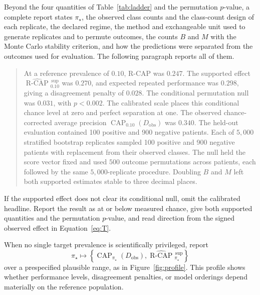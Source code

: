 \documentclass[11pt]{article}
\newcommand{\CAP}{\operatorname{CAP}}
\newcommand{\Tpi}{\CAP_{\pi_\star}}
\newcommand{\RCAPHat}{\widehat{\operatorname{R\text{-}CAP}}{}^{\,\mathrm{sup}}_{\pi_\star}}
\theoremstyle{remark}
\begin{document}
Beyond the four quantities of Table~\ref{tab:ladder} and the permutation $p$-value, a complete report states $\pi_\star$, the observed class counts and the class-count design of each replicate, the declared regime, the method and exchangeable unit used to generate replicates and to permute outcomes, the counts $B$ and $M$ with the Monte Carlo stability criterion, and how the predictions were separated from the outcomes used for evaluation. The following paragraph reports all of them.
\begin{quote}
At a reference prevalence of $0.10$, R-CAP was $0.247$. The supported effect $\widehat{\operatorname{R\text{-}CAP}}{}^{\,\mathrm{sup}}_{0.10}$ was $0.270$, and expected repeated performance was $0.298$, giving a disagreement penalty of $0.028$. The conditional permutation null was $0.031$, with $p<0.002$. The calibrated scale places this conditional chance level at zero and perfect separation at one. The observed chance-corrected average precision $\CAP_{0.10}(D_{\mathrm{obs}})$ was $0.340$. The held-out evaluation contained 100 positive and 900 negative patients. Each of $5{,}000$ stratified bootstrap replicates sampled 100 positive and 900 negative patients with replacement from their observed classes. The null held the score vector fixed and used $500$ outcome permutations across patients, each followed by the same $5{,}000$-replicate procedure. Doubling $B$ and $M$ left both supported estimates stable to three decimal places.
\end{quote}

If the supported effect does not clear its conditional null, omit the calibrated headline. Report the result as at or below measured chance, give both supported quantities and the permutation $p$-value, and read direction from the signed observed effect in Equation~\eqref{eq:T}.

When no single target prevalence is scientifically privileged, report
\[
\pi_\star
\longmapsto
\left\{
\Tpi(D_{\mathrm{obs}}),
\RCAPHat
\right\}
\]
over a prespecified plausible range, as in Figure~\ref{fig:profile}. This profile shows whether performance levels, disagreement penalties, or model orderings depend materially on the reference population.
\end{document}
